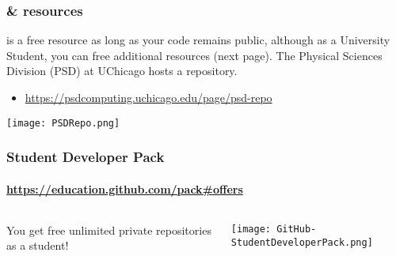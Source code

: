 \documentclass[hyperref={colorlinks=true}]{beamer}
\begin{document}

\begin{frame}%
  \frametitle{\github \& \gitlab resources }
  
  \github is a free resource as long as your code remains public, although as a University Student, you can free additional resources (next page). The Physical Sciences Division (PSD) at UChicago hosts a  \gitlab repository.

  \begin{itemize}
    \item \url{https://psdcomputing.uchicago.edu/page/psd-repo}
  \end{itemize}
  
  \texttt{[image: PSDRepo.png]}

\end{frame}


\begin{frame}%
  \frametitle{\github Student Developer Pack}
  \framesubtitle{\url{https://education.github.com/pack\#offers}}
  
  \begin{columns}
  
    
      You get free unlimited private repositories as a student! 
    
    
      \texttt{[image: GitHub-StudentDeveloperPack.png]}
  
  \end{columns}

\end{frame}

\end{document}
